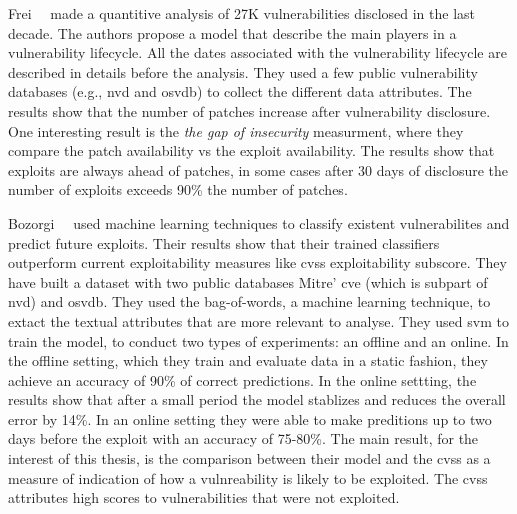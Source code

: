 Frei~\etal{}~\cite{Frei:2010} made a quantitive analysis of 27K vulnerabilities disclosed in the last decade.
The authors propose a model that describe the main players in a vulnerability lifecycle.
All the dates associated with the vulnerability lifecycle are described in details before the analysis.
They used a few public vulnerability databases (e.g., \gls{nvd} and \gls{osvdb}) to collect the different data attributes.
The results show that the number of patches increase after vulnerability disclosure.  
One interesting result is the \emph{the gap of insecurity} measurment, where they compare the patch availability vs the exploit availability. 
The results show that exploits are always ahead of patches, in some cases after 30 days of disclosure the number of exploits exceeds 90\% the number of patches.


Bozorgi~\etal{}~\cite{Bozorgi:2010} used machine learning techniques to classify existent vulnerabilites and predict future exploits.
Their results show that their trained classifiers outperform current exploitability measures like \gls{cvss} exploitability subscore.
They have built a dataset with two public databases Mitre' \gls{cve} (which is subpart of \gls{nvd}) and \gls{osvdb}.
They used the bag-of-words, a machine learning technique, to extact the textual attributes that are more relevant to analyse.
They used \gls{svm} to train the model, to conduct two types of experiments: an offline and an online.
In the offline setting, which they train and evaluate data in a static fashion, they achieve an accuracy of 90\% of correct predictions.
In the online settting, the results show that after a small period the model stablizes and reduces the overall error by 14\%.
In an online setting they were able to make preditions up to two days before the exploit with an accuracy of 75-80\%.
The main result, for the interest of this thesis, is the comparison between their model and the \gls{cvss} as a measure of indication of how a vulnreability is likely to be exploited.
The \gls{cvss} attributes high scores to vulnerabilities that were not exploited. 

